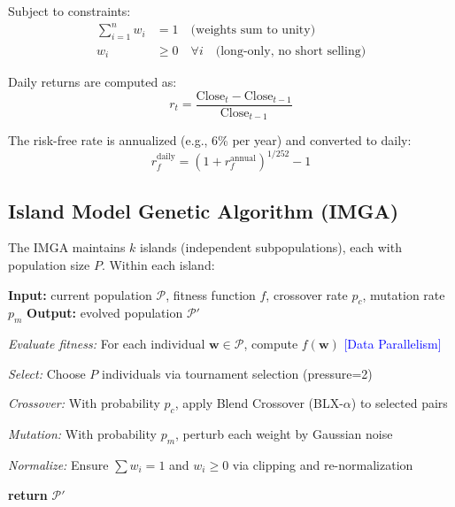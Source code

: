 \documentclass[12pt,a4paper]{article}
\begin{document}
Subject to constraints:
\begin{equation}
\begin{aligned}
\sum_{i=1}^{n} w_i &= 1 \quad \text{(weights sum to unity)} \\
w_i &\geq 0 \quad \forall i \quad \text{(long-only, no short selling)}
\end{aligned}
\label{eq:constraints}
\end{equation}

Daily returns are computed as:
\begin{equation}
r_t = \frac{\text{Close}_t - \text{Close}_{t-1}}{\text{Close}_{t-1}}
\label{eq:daily_return}
\end{equation}

The risk-free rate is annualized (e.g., 6\% per year) and converted to daily:
\begin{equation}
r_f^{\text{daily}} = (1 + r_f^{\text{annual}})^{1/252} - 1
\label{eq:daily_rf}
\end{equation}

\subsection{Island Model Genetic Algorithm (IMGA)}

The IMGA maintains $k$ islands (independent subpopulations), each with population size $P$. Within each island:

\begin{algorithm}
	\caption{Island Model Genetic Algorithm (Single Island, One Generation)}
	\label{algo:single_island}
	\begin{algorithmic}[1]
		\State \textbf{Input:} current population $\mathcal{P}$, fitness function $f$, crossover rate $p_c$, mutation rate $p_m$
		\State \textbf{Output:} evolved population $\mathcal{P}'$
		
		\State \textit{Evaluate fitness:} For each individual $\mathbf{w} \in \mathcal{P}$, compute $f(\mathbf{w})$ \quad \textcolor{blue}{[Data Parallelism]}
		
		\State \textit{Select:} Choose $P$ individuals via tournament selection (pressure=2)
		
		\State \textit{Crossover:} With probability $p_c$, apply Blend Crossover (BLX-$\alpha$) to selected pairs
		
		\State \textit{Mutation:} With probability $p_m$, perturb each weight by Gaussian noise
		
		\State \textit{Normalize:} Ensure $\sum w_i = 1$ and $w_i \geq 0$ via clipping and re-normalization
		
		\State \textbf{return} $\mathcal{P}'$
	\end{algorithmic}
\end{algorithm}
\end{document}
